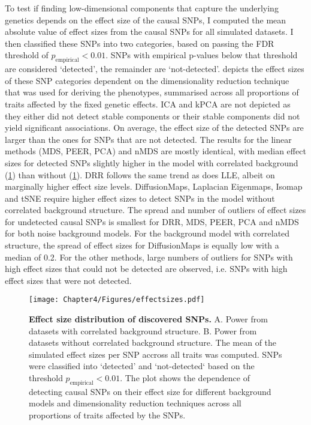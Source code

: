 To test if finding low-dimensional components that capture the underlying genetics depends on the effect size of the causal SNPs, I computed the mean absolute value of effect sizes from the causal SNPs for all simulated datasets. I then classified these SNPs into two categories, based on passing the FDR threshold of \(p_\text{empirical} < 0.01\). SNPs with empirical p-values below that threshold are considered `detected', the remainder are `not-detected'.  depicts the effect sizes of these SNP categories dependent on the dimensionality reduction technique that was used for deriving the phenotypes, summarised across all proportions of traits affected by the fixed genetic effects. ICA and kPCA are not depicted as they either did not detect stable components or their stable components did not yield significant associations. On average, the effect size of the detected SNPs are larger than the ones for SNPs that are not detected. The results for the linear methods (MDS, PEER, PCA) and nMDS are mostly identical, with median effect sizes for detected SNPs slightly higher in the model with correlated background (\cref{fig:effectsizes-dimRed}) than without (\cref{fig:effectsizes-dimRed}). DRR follows the same trend as does LLE, albeit on marginally higher effect size levels. DiffusionMaps, Laplacian Eigenmaps, Isomap and tSNE require higher effect sizes to detect SNPs in the model without correlated background structure. The spread and number of outliers of effect sizes for undetected causal SNPs is smallest for DRR, MDS, PEER, PCA and nMDS for both noise background models. For the background model with correlated structure, the spread of effect sizes for DiffusionMaps is equally low with a median of \num{0.2}. For the other methods, large numbers of outliers for SNPs with high effect sizes that could not be detected are observed, i.e. SNPs with high effect sizes that were not detected.
%
\begin{figure}[hbtp]
	\centering
	\texttt{[image: Chapter4/Figures/effectsizes.pdf]}
	\caption[\textbf{Effect size distribution of discovered SNPs.}]{\textbf{Effect size distribution of discovered SNPs. } A. Power from datasets with correlated background structure. B. Power from datasets without correlated background structure. The mean of the simulated effect sizes per SNP accross all traits was computed. SNPs were classified into `detected' and `not-detected` based on the threshold \(p_\text{empirical} < 0.01\). The plot shows the dependence of detecting causal SNPs on their effect size for different background models and dimensionality reduction techniques across all proportions of traits affected by the SNPs.} 
	 	\label{fig:effectsizes-dimRed}
\end{figure}
%
